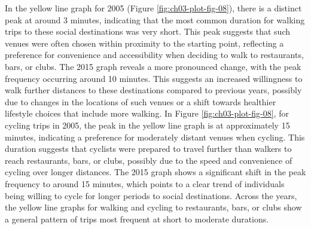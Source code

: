 \documentclass[
11pt, %
oneside, %
english, %
singlespacing, %
]{macthesis} %
\begin{document}
In the yellow line graph for 2005 (Figure \ref{fig:ch03-plot-fig-08}), there is a distinct peak at around 3 minutes, indicating that the most common duration for walking trips to these social destinations was very short. This peak suggests that such venues were often chosen within proximity to the starting point, reflecting a preference for convenience and accessibility when deciding to walk to restaurants, bars, or clubs. The 2015 graph reveals a more pronounced change, with the peak frequency occurring around 10 minutes. This suggests an increased willingness to walk further distances to these destinations compared to previous years, possibly due to changes in the locations of such venues or a shift towards healthier lifestyle choices that include more walking. In Figure \ref{fig:ch03-plot-fig-08}, for cycling trips in 2005, the peak in the yellow line graph is at approximately 15 minutes, indicating a preference for moderately distant venues when cycling. This duration suggests that cyclists were prepared to travel further than walkers to reach restaurants, bars, or clubs, possibly due to the speed and convenience of cycling over longer distances. The 2015 graph shows a significant shift in the peak frequency to around 15 minutes, which points to a clear trend of individuals being willing to cycle for longer periods to social destinations. Across the years, the yellow line graphs for walking and cycling to restaurants, bars, or clubs show a general pattern of trips most frequent at short to moderate durations.
\end{document}

